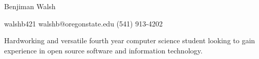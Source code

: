 \documentclass[12pt,letterpaper]{article}
\begin{document}
	\centering
	{\huge
		Benjiman Walsh
	}

	\vspace{0.75cm}
    
    \hspace{1.75cm}
    \raggedright
    \faGithub 
	\hspace{0.15cm}
	walshb421
	\hspace{0.75cm}
	\faEnvelope
	\hspace{0.15cm}
	walshb@oregonstate.edu	
	\hspace{0.75cm}
	\faPhone
	\hspace{0.15cm}
	(541) 913-4202
	
	\noindent\makebox[\linewidth]{\rule{\linewidth}{0.4pt}}
	
	
	\raggedright
	\hspace{0.5cm}
	
	Hardworking and versatile fourth year computer science student looking to gain experience in open source software and information technology.
	
\end{document}
